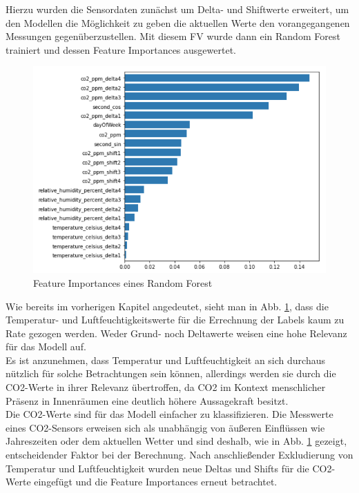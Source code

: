 Hierzu wurden die Sensordaten zunächst um Delta- und Shiftwerte erweitert, um den Modellen die Möglichkeit zu geben
die aktuellen Werte den vorangegangenen Messungen gegenüberzustellen. Mit diesem FV wurde dann ein Random Forest
trainiert und dessen Feature Importances ausgewertet.

\newpage
\begin{figure}[h]
    \centering
    \includegraphics[width=1.0\textwidth]{pic/feature_importances.png}
    \caption{Feature Importances eines Random Forest}
    \label{fig:FI}
\end{figure}

Wie bereits im vorherigen Kapitel angedeutet, sieht man in Abb. \ref{fig:FI}, dass die Temperatur- und 
Luftfeuchtigkeitswerte für die Errechnung der Labels kaum zu Rate gezogen werden. 
Weder Grund- noch Deltawerte weisen eine hohe Relevanz für das Modell auf.\\
Es ist anzunehmen, dass Temperatur und Luftfeuchtigkeit an sich durchaus nützlich für solche Betrachtungen sein
können, allerdings werden sie durch die CO2-Werte in ihrer Relevanz übertroffen, da CO2 im Kontext menschlicher
Präsenz in Innenräumen eine deutlich höhere Aussagekraft besitzt.\\
Die CO2-Werte sind für das Modell einfacher zu klassifizieren. Die Messwerte
eines CO2-Sensors erweisen sich als unabhängig von äußeren Einflüssen wie Jahreszeiten oder dem aktuellen Wetter 
und sind deshalb, wie in Abb. \ref{fig:FI} gezeigt, entscheidender Faktor bei der Berechnung.
\newpage
Nach anschließender Exkludierung von Temperatur und Luftfeuchtigkeit wurden neue Deltas und Shifts für die 
CO2-Werte eingefügt und die Feature Importances erneut betrachtet. 

